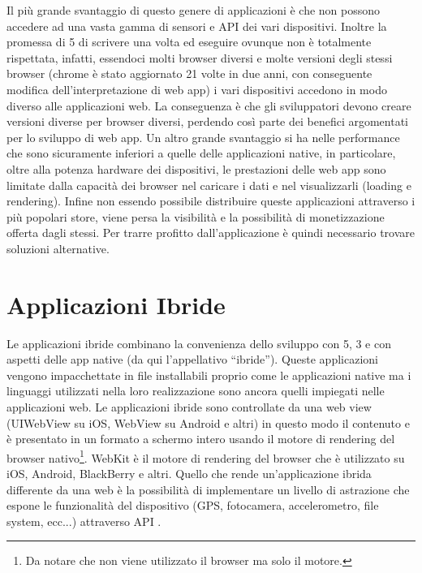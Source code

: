         Il più grande svantaggio di questo genere di applicazioni è che non
        possono accedere ad una vasta gamma di sensori e API dei vari
        dispositivi. Inoltre la promessa di \html{}5 di scrivere una volta ed eseguire
        ovunque non è totalmente rispettata, infatti, essendoci molti \mbox{browser}
        diversi e molte versioni degli stessi \mbox{browser} (chrome è stato aggiornato
        21 volte in due anni, con conseguente modifica dell'interpretazione di
        web app\citep{White:Native-vs-Html}) i vari dispositivi accedono in modo
        diverso alle applicazioni web. La conseguenza è che gli sviluppatori
        devono creare versioni diverse per \mbox{browser} diversi, perdendo così
        parte dei benefici argomentati per lo sviluppo di web app. Un
        altro grande svantaggio si ha nelle performance che sono sicuramente
        inferiori a quelle delle applicazioni native, in particolare, oltre
        alla potenza hardware dei dispositivi, le prestazioni delle web app
        sono limitate dalla capacità dei \mbox{browser} nel
        caricare i dati e nel visualizzarli (load\-ing e ren\-der\-ing). Infine non
        essendo possibile distribuire queste applicazioni attraverso i più
        popolari \mbox{store}, viene persa la visibilità e la possibilità di
        monetizzazione offerta dagli stessi. Per trarre profitto
        dall'applicazione è quindi necessario trovare soluzioni alternative.

    \section{Applicazioni Ibride}
        Le applicazioni ibride combinano la convenienza dello sviluppo con
        \html{}5,
        \css{}3 e \js{} con aspetti delle app native (da qui l'appellativo
        ``ibride''). Queste applicazioni vengono impacchettate in file
        installabili proprio come le applicazioni native ma i linguaggi
        utilizzati nella loro realizzazione sono ancora quelli impiegati nelle
        applicazioni web. Le applicazioni ibride sono controllate da una web
        view (UIWebView su iOS, WebView su Android e altri) in questo modo il
        contenuto \js{} e \html{} è  presentato in un formato a schermo
        intero usando il motore di ren\-der\-ing del \mbox{browser} nativo\footnote{Da
        notare che non viene utilizzato il \mbox{browser} ma solo il motore.}. WebKit è
        il motore di ren\-der\-ing del \mbox{browser} che è utilizzato su iOS, Android,
        BlackBerry e altri. Quello che rende un'applicazione ibrida differente
        da una web è la possibilità di implementare un livello di astrazione
        che espone le funzionalità del dispositivo (GPS, fotocamera,
        accelerometro, file sys\-tem, ecc...) attraverso API \js{}.

